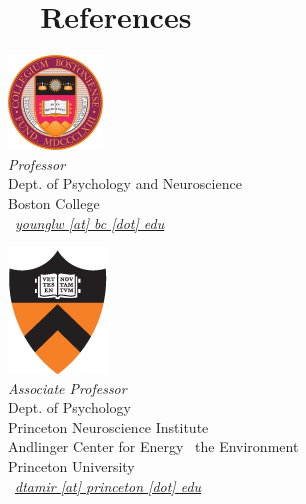 \documentclass[10pt, a4paper, english]{cv-public}
\begin{document}
\section*{\faUserPlus \ \ References}

\centering
\begin{multicols}{2}
\raggedright{
    \signature{\href{https://www.bc.edu/bc-web/schools/mcas/departments/psychology/people/faculty-directory/liane-young.html}{Liane Young, Ph.D.}} \includegraphics[scale=.1]{img/bc_seal.png} \\
    \textsl{Professor} \\
    Dept. of Psychology and Neuroscience \\
    Boston College \\
    {\footnotesize \faEnvelope} \ \textit{\href{mailto:younglw@bc.edu}{younglw [at] bc [dot] edu}} \\
}
\vspace{32.5pt}
\raggedright{
    \signature{\href{https://psych.princeton.edu/person/diana-tamir}{Diana I. Tamir, Ph.D.}}
    \includegraphics[scale=.07]{img/princeton_standard.png} \\
    \textsl{Associate Professor} \\
    Dept. of Psychology \\
    Princeton Neuroscience Institute \\
    Andlinger Center for Energy \Plus \ the Environment \\
    Princeton University \\
    {\footnotesize \faEnvelope} \ \textit{\href{mailto:dtamir@princeton.edu}{dtamir [at] princeton [dot] edu}} \\
}


\vfill\null
\columnbreak
\centering{
   
}
\end{multicols}
\end{document}
